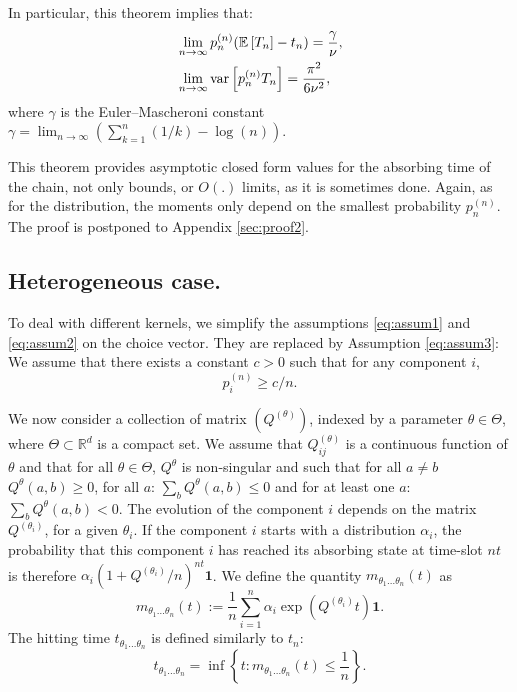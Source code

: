 \documentclass{aptpub}
\newcommand\expect[1]{\mathchoice{\bexpect{#1}}{\sexpect{#1}}{\sexpect{#1}}{\sexpect{#1}}}
\newcommand\bexpect[1]{\mathbb{E}\left[#1\right]}
\newcommand\sexpect[1]{\mathbb{E}[#1]}
\newcommand\variance[1]{\mathrm{var}\left[#1\right]}
\newcommand\R{\mathbb{R}}
\begin{document}
In particular, this theorem implies that:
\begin{align*}
  &\lim_{n\to\infty}p^{(n)}_n(\expect{T_n}  - t_n) =
    \frac\gamma\nu,\\
  &\lim_{n\to\infty} \variance{p^{(n)}_nT_n} = \frac{\pi^2}{6\nu^2},
\end{align*}
where $\gamma$ is the Euler–Mascheroni constant
$\gamma=\lim_{n\to\infty}\left(\sum_{k=1}^n(1/k)- \log(n) \right)$.


This theorem provides asymptotic closed form values for the absorbing
time of the chain, not only bounds, or $O(.)$ limits, as it is
sometimes done.  Again, as for the distribution, the moments only
depend on the smallest probability $p^{(n)}_n$.  The proof is
postponed to Appendix \ref{sec:proof2}.


\subsection{Heterogeneous case.}
\label{sec:hetero}

To deal with different kernels, we simplify the assumptions
\eqref{eq:assum1} and \eqref{eq:assum2} on the choice vector.  They
are replaced by Assumption \eqref{eq:assum3}: We assume that there
exists a constant $c>0$ such that for any component $i$,
\begin{equation}\label{eq:assum3}
  p^{(n)}_i\ge c/n. 
\end{equation}


We now consider a collection of matrix $(Q^{(\theta)})$, indexed by a
parameter $\theta\in \Theta$, where $\Theta\subset\R^d$ is a compact
set. We assume that $Q^{(\theta)}_{ij}$ is a continuous function of
$\theta$ and that for all $\theta\in \Theta$, $Q^{\theta}$ is
non-singular and such that for all $a\ne b$ $Q^{\theta}(a,b)\ge0$, for
all $a$: $\sum_bQ^{\theta}(a,b)\le0$ and for at least one $a$:
$\sum_bQ^{\theta}(a,b)<0$.  The evolution of the component $i$ depends on
the matrix $Q^{(\theta_i)}$, for a given $\theta_i$. If the component $i$
starts with a distribution $\alpha_i$, the probability that this
component $i$ has reached its absorbing state at time-slot $nt$ is
therefore $\alpha_i(1+Q^{(\theta_i)}/n)^{nt}\mathbf{1}$. We define the
quantity $m_{\theta_1\dots\theta_n}(t)$ as
\begin{equation*}
  m_{\theta_1\dots\theta_n}(t):=\frac1n\sum_{i=1}^n\alpha_i\exp(Q^{(\theta_i)}t)\mathbf{1}.
\end{equation*}
The hitting time $t_{\theta_1\dots\theta_n}$ is defined
similarly to $t_n$:
\begin{equation}
  t_{\theta_1\dots\theta_n}=\inf\left\{t:m_{\theta_1\dots\theta_n}(t)\le\frac1n\right\}.
  \label{eq:t_theta}
\end{equation}
\end{document}
